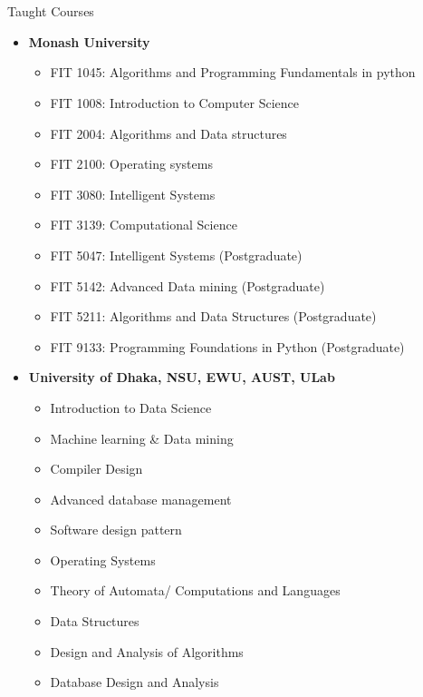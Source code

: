 \documentclass{my_cv}
\begin{document}
\section{\faLineChart}{Taught Courses}
\begin{itemize}[noitemsep]
    \item \textbf{Monash University}
        \begin{itemize}[noitemsep]
            \item FIT 1045: Algorithms and Programming Fundamentals in python
            \item FIT 1008: Introduction to Computer Science
            \item FIT 2004: Algorithms and Data structures
            \item FIT 2100: Operating systems
            \item FIT 3080: Intelligent Systems
            \item FIT 3139: Computational Science
            \item FIT 5047: Intelligent Systems (Postgraduate)
            \item FIT 5142: Advanced Data mining (Postgraduate)
            \item FIT 5211: Algorithms and Data Structures (Postgraduate)
            \item FIT 9133: Programming Foundations in Python (Postgraduate)
        \end{itemize}
    \item \textbf{University of Dhaka, NSU, EWU, AUST, ULab}
        \begin{itemize}[noitemsep]
            \item Introduction to Data Science
            \item Machine learning \& Data mining
            \item Compiler Design 
            \item Advanced database management
            \item Software design pattern
            \item Operating Systems
            \item Theory of Automata/ Computations and Languages
            \item Data Structures
            \item Design and Analysis of Algorithms
            \item Database Design and Analysis
        \end{itemize}
\end{itemize}
\end{document}
